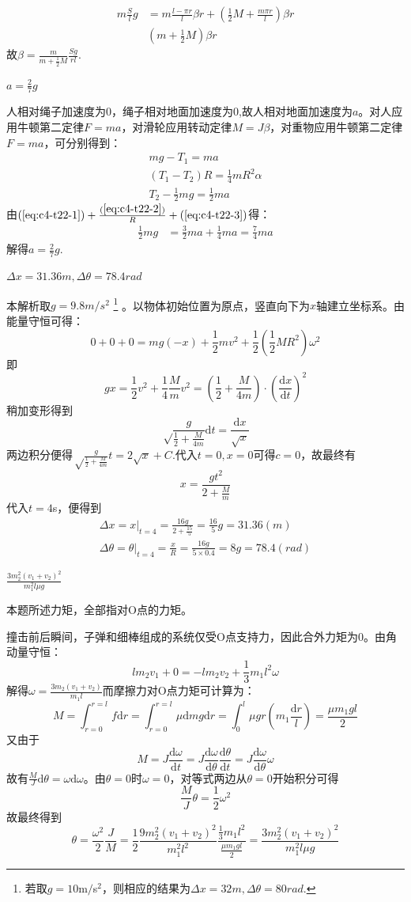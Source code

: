 \documentclass[b5paper,opensource,sourcefont,parskip]{qyxf-book}
\newcommand{\di}[1]{\mathrm{d}#1}
\newcommand{\dy}[2]{\frac{\di{#1}}{\di{#2}}}
\begin{document}
\begin{align*}
m\frac{S}{l}g&=m\frac{l-\pi r}{l}\beta r+\left(\frac{1}{2}M+\frac{m\pi r}{l}\right)\beta r\\
&\left(m+\frac{1}{2}M\right)\beta r
\end{align*}
故$\beta=\frac{m}{m+\frac{1}{2}M}\frac{Sg}{rl}$.

$a=\frac{2}{7}g$

\solve 人相对绳子加速度为0，绳子相对地面加速度为0,故人相对地面加速度为$a$。对人应用牛顿第二定律$F=ma$，对滑轮应用转动定律$M=J\beta$，对重物应用牛顿第二定律$F=ma$，可分别得到：
\begin{gather}
mg-T_1=ma\label{eq:c4-t22-1}\\
(T_1-T_2)R=\frac{1}{4}mR^2\alpha\label{eq:c4-t22-2}\\
T_2-\frac{1}{2}mg=\frac{1}{2}ma\label{eq:c4-t22-3}
\end{gather}
由$(\ref{eq:c4-t22-1})+\frac{(\ref{eq:c4-t22-2})}{R}+(\ref{eq:c4-t22-3})$得：
\begin{align*}
\frac{1}{2}mg&=\frac{3}{2}ma+\frac{1}{4}ma=\frac{7}{4}ma
\end{align*}
解得$a=\frac{2}{7}g.$

$\Delta x=31.36m,\Delta\theta=78.4rad$

\solve 本解析取$ g=9.8m/s^2 $
\footnote{若取$g=10$m$/$s${}^2$，则相应的结果为$\Delta x=32m,\Delta\theta=80rad.$}
。以物体初始位置为原点，竖直向下为$x$轴建立坐标系。由能量守恒可得：
\[0+0+0=mg(-x)+\frac{1}{2}mv^2+\frac{1}{2}\left(\frac{1}{2}MR^2\right)\omega^2\]
即
\[gx=\frac{1}{2}v^2+\frac{1}{4}\frac{M}{m}v^2=\left(\dfrac12+\frac{M}{4m}\right)\cdot\left(\dy{x}{t}\right)^2\]
稍加变形得到
\[\sqrt\frac{g}{\frac{1}{2}+\frac{M}{4m}}\di{t}=\frac{\di{x}}{\sqrt{x}}\]
两边积分便得$\sqrt\frac{g}{\frac{1}{2}+\frac{M}{4m}}t=2\sqrt{x}+C$.代入$ t=0,x=0$可得$c=0$，故最终有
\[x=\frac{gt^2}{2+\frac{M}{m}}\]
代入$t=4$s，便得到
\begin{gather*}
\Delta x=x\left.\right|_{t=4}=\frac{16g}{2+\frac{15}{5}}=\frac{16}{5}g=31.36(m)\\
\Delta\theta=\left.\theta\right|_{t=4}=\frac{x}{R}=\frac{16g}{5\times 0.4}=8g=78.4(rad)
\end{gather*}

$\frac{3m_2^2(v_1+v_2)^2}{m_1^2l\mu g}$

\solve 本题所述力矩，全部指对O点的力矩。

撞击前后瞬间，子弹和细棒组成的系统仅受O点支持力，因此合外力矩为0。由角动量守恒：
\[lm_2v_1+0=-lm_2v_2+\frac{1}{3}m_1l^2\omega\]
解得$\omega=\frac{3m_2(v_1+v_2)}{m_1l}$而摩擦力对O点力矩可计算为：
\[M=\int_{r=0}^{r=l}f\di{r}=\int_{r=0}^{r=l}\mu \di{m}g\di{r}=\int_0^l\mu gr\left(m_1\frac{\di{r}}{l}\right)=\frac{\mu m_1gl}{2}\]
又由于
\[M=J\dy{\omega}{t}=J\dy{\omega}{\theta}\dy{\theta}{t}=J\dy{\omega}{\theta}\omega\]
故有$\frac{M}{J}\di{\theta}=\omega\di{\omega}$。由$\theta=0$时$\omega=0$，对等式两边从$\theta=0$开始积分可得
\[\frac{M}{J}\theta=\frac{1}{2}\omega^2\]
故最终得到
\[\theta=\frac{\omega^2}{2}\frac{J}{M}=\frac{1}{2}\frac{9m_2^2(v_1+v_2)^2}{m_1^2l^2}\frac{\frac{1}{3}m_1l^2}{\frac{\mu m_1gl}{2}}=\frac{3m_2^2(v_1+v_2)^2}{m_1^2l\mu g}\]
\end{document}
